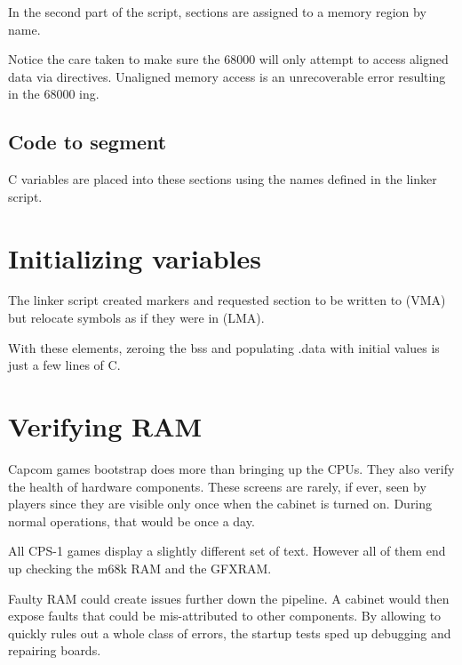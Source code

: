 

In the second part of the script, sections are assigned to a memory region by name.

\begin{trivia}
Notice the care taken to make sure the 68000 will only attempt to access aligned data via  directives. Unaligned memory access is an unrecoverable error resulting in the 68000 ing.
\end{trivia}


\subsection{Code to segment}

C variables are placed into these sections using the names defined in the linker script.





\section{Initializing variables}
The linker script created markers and requested section  to be written to  (VMA) but relocate symbols as if they were in  (LMA).

With these elements, zeroing the bss and populating .data with initial values is just a few lines of C.



\pagebreak
\section{Verifying RAM}
Capcom games bootstrap does more than bringing up the CPUs. They also verify the health of hardware components. These screens are rarely, if ever, seen by players since they are visible only once when the cabinet is turned on. During normal operations, that would be once a day.

All CPS-1 games display a slightly different set of text. However all of them end up checking the m68k RAM and the GFXRAM. 

Faulty RAM could create issues further down the pipeline. A cabinet would then expose faults that could be mis-attributed to other components. By allowing to quickly rules out a whole class of errors, the startup tests sped up debugging and repairing boards.

